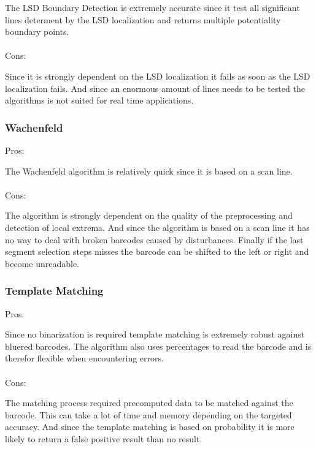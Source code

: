 The LSD Boundary Detection is extremely accurate since it test all significant lines determent by the LSD localization and returns multiple potentiality boundary points.
\\
\\
Cons:

Since it is strongly dependent on the LSD localization it fails as soon as the LSD localization fails. And since an enormous amount of lines needs to be tested the algorithms is not suited for real time applications.

\subsubsection*{Wachenfeld}
Pros:

The Wachenfeld algorithm is relatively quick since it is based on a scan line.
\\
\\
Cons:

The algorithm is strongly dependent on the quality of the preprocessing and detection of local extrema. And since the algorithm is based on a scan line it has no way to deal with broken barcodes caused by disturbances. Finally if the last segment selection steps misses the barcode can be shifted to the left or right and become unreadable.
 
\subsubsection*{Template Matching}
Pros:

Since no binarization is required template matching is extremely robust against bluered barcodes. The algorithm also uses percentages to read the barcode and is therefor flexible when encountering errors. 
\\
\\
Cons:

The matching process required precomputed data to be matched against the barcode. This can take a lot of time and memory depending on the targeted accuracy. And since the template matching is based on probability it is more likely to return a false positive result than no result.

